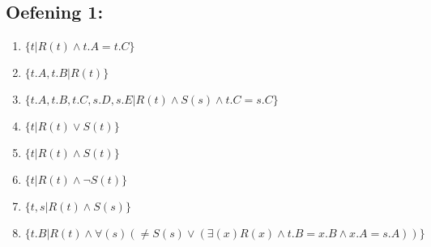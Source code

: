 \documentclass[../Oefenzitting5.tex]{subfiles}
\begin{document}
  \subsection{Oefening 1:}
    \begin{enumerate}[label=\alph*)]
      \item
        $
          \{ t | R(t) \wedge t.A = t.C \}
        $
      \item
        $
          \{ t.A, t.B | R(t) \}
        $
      \item
        $
          \{ t.A, t.B, t.C, s.D, s.E | R(t) \wedge S(s) \wedge t.C = s.C \}
        $
      \item
        $
          \{ t | R(t) \vee S(t)  \}
        $
      \item
        $
          \{ t | R(t) \wedge S(t) \}
        $
      \item
        $
          \{ t | R(t) \wedge \neg S(t) \}
        $
      \item
        $
          \{ t,s | R(t) \wedge S(s) \}
        $
      \item
        $
          \{ t.B | R(t) \wedge \forall(s) (\neq S(s) \vee ( \exists (x) R(x) \wedge t.B = x.B \wedge x.A = s.A)) \} 
        $

    \end{enumerate}
\end{document}
